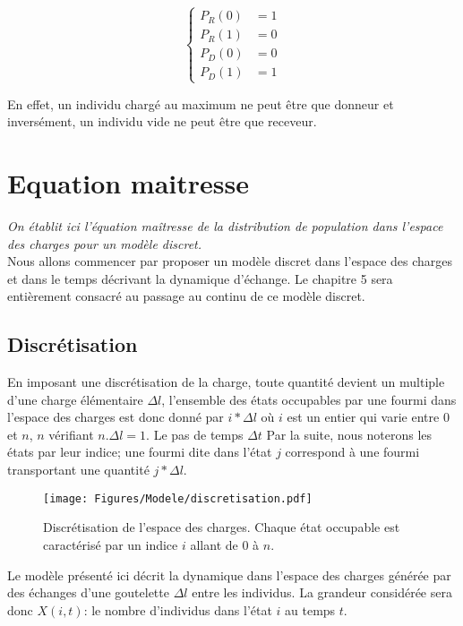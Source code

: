 \begin{equation}
\left \{
\begin{aligned}
P_R(0)&=1 \\
P_R(1)&=0 \\
P_D(0)&=0 \\
P_D(1)&=1
\end{aligned}
\right.
\label{ConditionsBordsProbabilite}
\end{equation}

En effet, un individu chargé au maximum ne peut être que donneur et inversément, un individu vide ne peut être que receveur.


\section{Equation maitresse}
\textit{On établit ici l'équation maîtresse de la distribution de population dans l'espace des charges pour un modèle discret.}\\

Nous allons commencer par proposer un modèle discret dans l'espace des charges et dans le temps décrivant la dynamique d'échange. Le chapitre 5 sera entièrement consacré au passage au continu de ce modèle discret.\\

\subsection{Discrétisation}
En imposant une discrétisation de la charge, toute quantité devient un multiple d'une charge élémentaire $\Delta l$, l'ensemble des états occupables par une fourmi dans l'espace des charges est donc donné par $i*\Delta l$ où $i$ est un entier qui varie entre $0$ et $n$, $n$ vérifiant $n.\Delta l = 1$. Le pas de temps $\Delta t$
Par la suite, nous noterons les états par leur indice; une fourmi dite dans l'état $j$ correspond à une fourmi transportant une quantité $j* \Delta l$.\\

\begin{figure}[h]
\centering
\texttt{[image: Figures/Modele/discretisation.pdf]}
\caption{Discrétisation de l'espace des charges. Chaque état occupable est caractérisé par un indice $i$ allant de $0$ à $n$.}
\label{discretisation}
\end{figure}

Le modèle présenté ici décrit la dynamique dans l'espace des charges générée par des échanges d'une goutelette $\Delta l$ entre les individus. La grandeur considérée sera donc $X(i,t)$: le nombre d'individus dans l'état $i$ au temps $t$.\\

